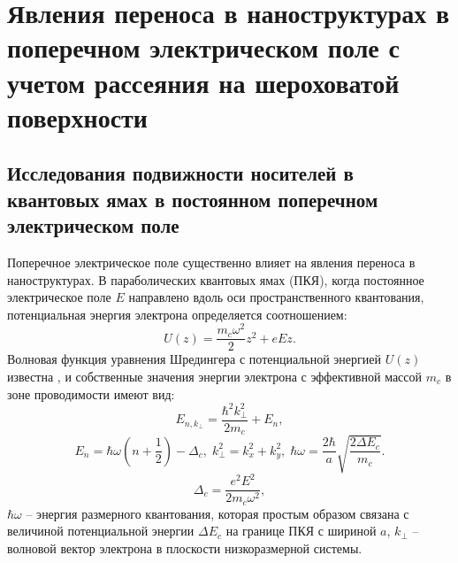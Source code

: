 \chapter{Явления переноса в наноструктурах в поперечном электрическом поле с учетом рассеяния на шероховатой поверхности} \label{chapt4}

\section{Исследования подвижности носителей в квантовых ямах в постоянном поперечном электрическом поле} \label{sect4_1}

Поперечное электрическое поле существенно влияет на явления переноса в наноструктурах. В параболических квантовых ямах (ПКЯ), когда постоянное электрическое поле $E$ направлено вдоль оси пространственного квантования, потенциальная энергия электрона определяется соотношением:
\[
U(z)=\frac{m_c \omega^2 }{2} z^2 +eEz.
\]
Волновая функция уравнения Шредингера с потенциальной энергией $U(z)$ известна \cite{Sinyavskii1998}, и собственные значения энергии электрона с эффективной массой $m_c$ в зоне проводимости имеют вид:
\begin{equation} \label{eq:41_10}
E_{n,k_{\bot } } =\frac{\hbar^2 k_{\bot }^2 }{2m_c} +E_n,
\end{equation}
\[
E_n =\hbar \omega \left(n+\frac{1}{2} \right)-\Delta_c, \;
k_{\bot }^2 =k_x^2 +k_y^2, \;
\hbar \omega =\frac{2\hbar }{a} \sqrt{\frac{2\Delta E_c }{m_c} } .
\]
\begin{equation} \label{eq:41_15}
\Delta_c =\frac{e^2 E^2 }{2m_c \omega^2},
\end{equation}
$\hbar \omega $ -- энергия размерного квантования, которая простым образом связана с величиной потенциальной энергии $\Delta E_c$ на границе ПКЯ с шириной $a$, $k_{\bot } $ -- волновой вектор электрона в плоскости низкоразмерной системы. 

